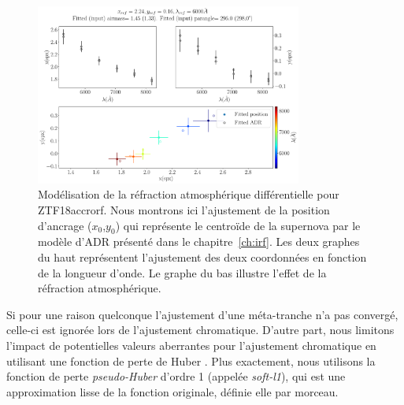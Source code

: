 \documentclass[../main/main.tex]{subfiles}
\begin{document}
\begin{figure}[ht]
  \centering
  \includegraphics[width=0.78\textwidth]{../figures/07_scene/adr_ZTF18accrorf.pdf}
  \caption[Modélisation de la réfraction atmosphérique
  différentielle pour ZTF18accrorf]{Modélisation de la réfraction atmosphérique
    différentielle pour ZTF18accrorf. Nous montrons ici
    l'ajustement de la position d'ancrage ($x_{0}$,$y_{0}$) qui
    représente le centroïde de la supernova par le modèle
    d'ADR présenté dans le chapitre~\ref{ch:irf}. Les deux graphes du haut représentent l'ajustement des deux
    coordonnées en fonction de la longueur d'onde. Le graphe du bas
    illustre l'effet de la réfraction atmosphérique.}
  \label{fig:adr_ZTF18accrorf}
\end{figure}

Si pour une raison quelconque l'ajustement d'une méta-tranche n'a pas
convergé, celle-ci est ignorée lors de l'ajustement chromatique. D'autre
part, nous limitons l'impact de potentielles valeurs aberrantes pour
l'ajustement chromatique en
utilisant une fonction de perte de Huber \citep{Huber1964}. Plus
exactement, nous utilisons la fonction de perte \textit{pseudo-Huber}
d'ordre 1 (appelée \textit{soft-l1}),
qui est une approximation lisse de la fonction originale, définie elle par
morceau.
\end{document}
